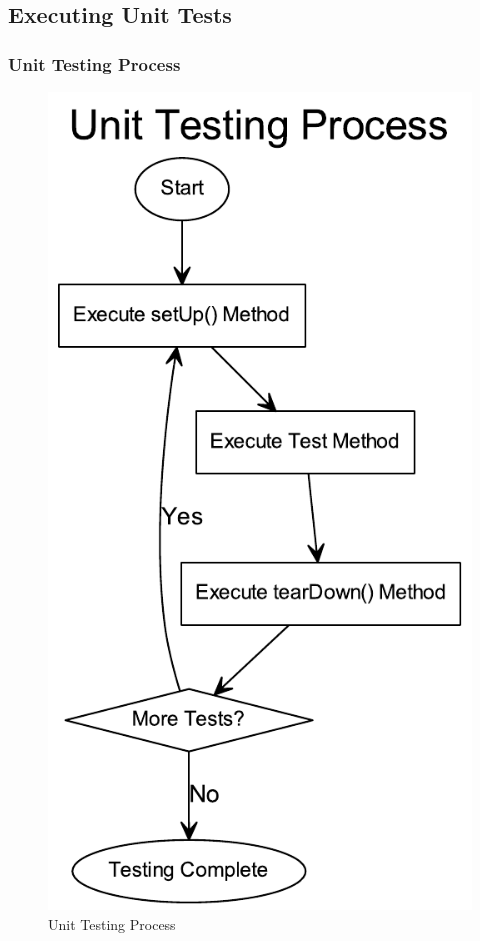 \documentclass[aspectratio=169]{beamer}
\begin{document}
\subsection{Executing Unit Tests}
\begin{frame}
\frametitle{Unit Testing Process}
\begin{figure}
\includegraphics[scale=0.36]{../artifacts/unit-testing-flow.pdf}
\caption{Unit Testing Process}
\label{fig:flow}
\end{figure}
\end{frame}
\end{document}
